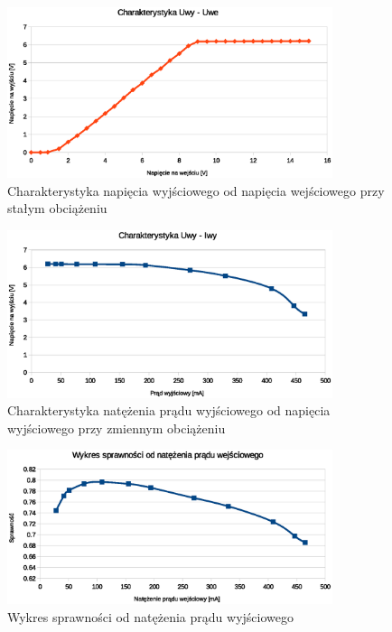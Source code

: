 \documentclass[a4paper,12pt]{article}
\begin{document}
\pagebreak
\begin{figure}[h!]
  \center
  \includegraphics[width=0.85\textwidth]{Uwe_Uwy.eps}
  \caption{Charakterystyka napięcia wyjściowego od napięcia wejściowego przy stałym obciążeniu}
\end{figure}


\begin{figure}[h!]
\center
\includegraphics[width=0.85\textwidth]{Uwy_Iwy.eps}
\caption{Charakterystyka natężenia prądu wyjściowego od napięcia wyjściowego przy zmiennym obciążeniu}
\end{figure}



\pagebreak

\begin{figure}[h!]
  \center
  \includegraphics[width=0.85\textwidth]{spr_Iwy.eps}
  \caption{Wykres sprawności od natężenia prądu wyjściowego}
  \end{figure}
  
\end{document}
